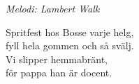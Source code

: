 {\footnotesize\textit{Melodi: Lambert Walk}}\par
\vspace{10pt}
Spritfest hos Bosse varje helg,\\
fyll hela gommen och så svälj.\\
Vi slipper hemmabränt,\\
för pappa han är docent.
